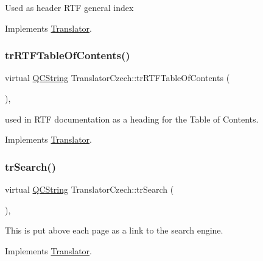 Used as header R\+TF general index 

Implements \mbox{\hyperlink{class_translator}{Translator}}.

\mbox{\label{class_translator_czech_a122ec8d634b0e4dd579752b446862208}} 
\subsubsection{\texorpdfstring{trRTFTableOfContents()}{trRTFTableOfContents()}}
{\footnotesize\ttfamily virtual \mbox{\hyperlink{class_q_c_string}{Q\+C\+String}} Translator\+Czech\+::tr\+R\+T\+F\+Table\+Of\+Contents (\begin{DoxyParamCaption}{ }\end{DoxyParamCaption})\hspace{0.3cm}{\ttfamily [inline]}, {\ttfamily [virtual]}}

used in R\+TF documentation as a heading for the Table of Contents. 

Implements \mbox{\hyperlink{class_translator}{Translator}}.

\mbox{\label{class_translator_czech_aee75046e81d4646858d5c5f91c87b2f7}} 
\subsubsection{\texorpdfstring{trSearch()}{trSearch()}}
{\footnotesize\ttfamily virtual \mbox{\hyperlink{class_q_c_string}{Q\+C\+String}} Translator\+Czech\+::tr\+Search (\begin{DoxyParamCaption}{ }\end{DoxyParamCaption})\hspace{0.3cm}{\ttfamily [inline]}, {\ttfamily [virtual]}}

This is put above each page as a link to the search engine. 

Implements \mbox{\hyperlink{class_translator}{Translator}}.

\mbox{\label{class_translator_czech_a6f7099bfc63f164b21bc85814bc95e94}} 
